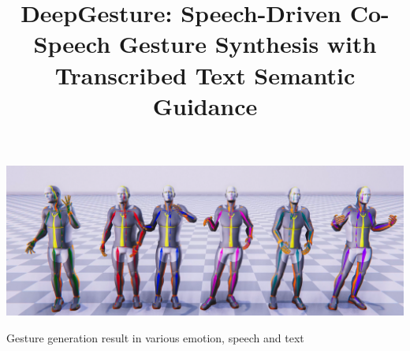 \documentclass[manuscript,review,anonymous]{acmart}
\begin{document}
\title{DeepGesture: Speech-Driven Co-Speech Gesture Synthesis with Transcribed Text Semantic Guidance}

 








\begin{teaserfigure}
	\centering
  \includegraphics[width=\textwidth]{figures/ListOfEmotion}
  \caption{Gesture generation result in various emotion, speech and text}
  \label{fig:teaser}
\end{teaserfigure}

\maketitle







%
%



%





\appendix
\renewcommand{\sectionautorefname}{Appendix}
\renewcommand{\subsectionautorefname}{Appendix}
\renewcommand{\subsubsectionautorefname}{Appendix}


\end{document}
